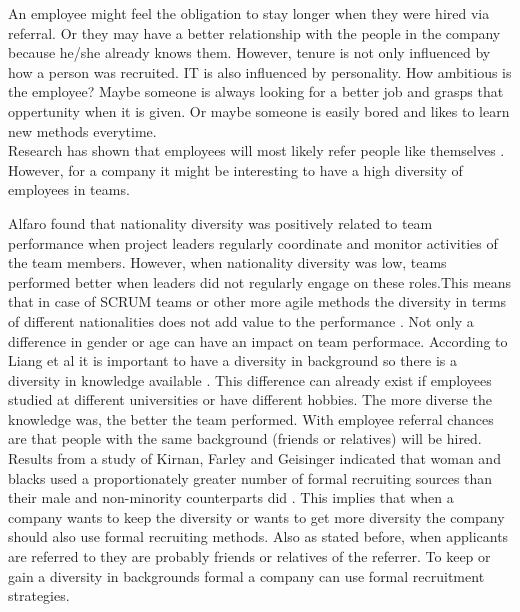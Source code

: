 \documentclass[Main.tex]{subfiles}
\begin{document}
An employee might feel the obligation to stay longer when they were hired via referral. Or they may have a better relationship with the people in the company because he/she already knows them. However, tenure is not only influenced by how a person was recruited. IT is also influenced by personality. How ambitious is the employee? Maybe someone is always looking for a better job and grasps that oppertunity when it is given. Or maybe someone is easily bored and likes to learn new methods everytime.\\

Research has shown that employees will most likely refer people like themselves \cite{sixth}. However, for a company it might be interesting to have a high diversity of employees in teams. 

Alfaro found that nationality diversity was positively related to team performance when project leaders regularly coordinate and monitor activities of the team members. However, when nationality diversity was low, teams performed better when leaders did 
not regularly engage on these roles.This means that in case of SCRUM teams or other more agile methods the diversity in terms of different nationalities does not add value to the performance \cite{diversity}.
Not only a difference in gender or age can have an impact on team performace. According to Liang et al it is important to have a diversity in background so there is a diversity in knowledge available \cite{teamdiversity}. This difference can already exist if employees studied at different universities or have different hobbies. The more diverse the knowledge was, the better the team performed. With employee referral chances are that people with the same background (friends or relatives) will be hired. \\

Results from a study of Kirnan, Farley and Geisinger indicated that woman
 and blacks used a proportionately greater number of formal recruiting sources than their male and non-minority counterparts did \cite{tenth}. This implies that when a company wants to keep the diversity or wants to get more diversity the company should also use formal recruiting methods. Also as stated before, when applicants are referred to they are probably friends or relatives of the referrer. To keep or gain a diversity in backgrounds formal a company can use formal recruitment strategies.
\end{document}
